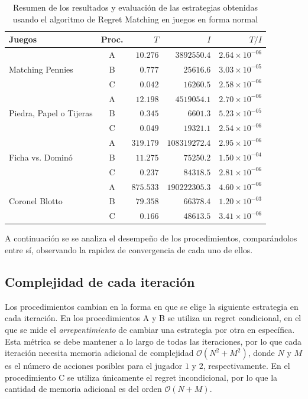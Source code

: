 \begin{table}[htpb]
    \centering
    \begin{tabular}{l | c |r r r}
        Juegos & Proc. & $T$ & $I$ & $T/I$ \\ \hline
        \multirow{3}{*}{Matching Pennies}
            & A & $10.276$ & $3892550.4$ & $2.64 {\times} 10^{-06}$ \\
            & B &  $0.777$ &   $25616.6$ & $3.03 {\times} 10^{-05}$ \\
            & C &  $0.042$ &   $16260.5$ & $2.58 {\times} 10^{-06}$ \\ \hline
        \multirow{3}{*}{Piedra, Papel o Tijeras}
            & A & $12.198$ & $4519054.1$ & $2.70 {\times} 10^{-06}$ \\
            & B &  $0.345$ &    $6601.3$ & $5.23 {\times} 10^{-05}$ \\
            & C &  $0.049$ &   $19321.1$ & $2.54 {\times} 10^{-06}$ \\ \hline
        \multirow{3}{*}{Ficha vs. Dominó}
            & A & $319.179$ & $108319272.4$ & $2.95 {\times} 10^{-06}$ \\
            & B &  $11.275$ &     $75250.2$ & $1.50 {\times} 10^{-04}$ \\
            & C &   $0.237$ &     $84318.5$ & $2.81 {\times} 10^{-06}$ \\ \hline
        \multirow{3}{*}{Coronel Blotto}
            & A & $875.533$ & $190222305.3$ & $4.60 {\times} 10^{-06}$ \\
            & B &  $79.358$ &     $66378.4$ & $1.20 {\times} 10^{-03}$ \\
            & C &   $0.166$ &     $48613.5$ & $3.41 {\times} 10^{-06}$ \\ \hline
    \end{tabular}
    \caption{Resumen de los resultados y evaluación de las estrategias obtenidas usando el algoritmo de Regret Matching en juegos en forma normal}
    \label{tab:resumen-regret-tiempo-RM}
\end{table}

A continuación se se analiza el desempeño de los procedimientos, comparándolos entre sí, observando la rapidez de convergencia de cada uno de ellos.

\subsection{Complejidad de cada iteración}

Los procedimientos cambian en la forma en que se elige la siguiente estrategia en cada iteración. En los procedimientos A y B se utiliza un regret condicional, en el que se mide el \textit{arrepentimiento} de cambiar una estrategia por otra en específica. Esta métrica se debe mantener a lo largo de todas las iteraciones, por lo que cada iteración necesita memoria adicional de complejidad $\mathcal{O}(N^2 + M^2)$, donde $N$ y $M$ es el número de acciones posibles para el jugador $1$ y $2$, respectivamente. En el procedimiento C se utiliza únicamente el regret incondicional, por lo que la cantidad de memoria adicional es del orden $\mathcal{O}(N + M)$.

